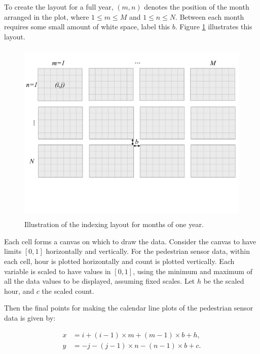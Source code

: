 \documentclass[article]{jss}
\begin{document}
To create the layout for a full year, \((m, n)\) denotes the position of
the month arranged in the plot, where \(1 \le m \le M\) and
\(1 \le n \le N\). Between each month requires some small amount of
white space, label this \(b\). Figure \ref{fig:year-diagram} illustrates
this layout.

\begin{CodeChunk}
\begin{figure}

{\centering \includegraphics[width=360pt,height=250pt]{figure/year} 

}

\caption[Illustration of the indexing layout for months of one year]{Illustration of the indexing layout for months of one year.}\label{fig:year-diagram}
\end{figure}
\end{CodeChunk}

Each cell forms a canvas on which to draw the data. Consider the canvas
to have limits \([0, 1]\) horizontally and vertically. For the
pedestrian sensor data, within each cell, hour is plotted horizontally
and count is plotted vertically. Each variable is scaled to have values
in \([0,1]\), using the minimum and maximum of all the data values to be
displayed, assuming fixed scales. Let \(h\) be the scaled hour, and
\(c\) the scaled count.

Then the final points for making the calendar line plots of the
pedestrian sensor data is given by:

\begin{equation}
  \begin{aligned}
  x &= i + (i - 1) \times m + (m - 1) \times b + h, \\
  y &= -j - (j - 1) \times n - (n - 1) \times b + c. \label{eq:final}
  \end{aligned}
\end{equation}
\end{document}
